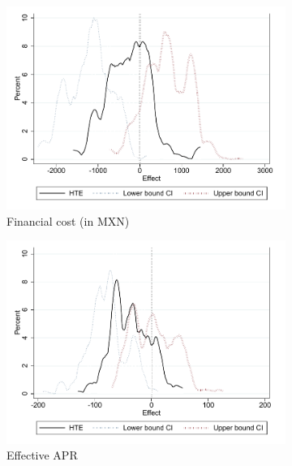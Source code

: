 \documentclass[oneside,11pt]{article}
\begin{document}
\begin{figure}[H]
     \caption{Heterogeneous Treatment Effects}
    \label{heterogeneous_effects}
    \begin{center}
    \begin{subfigure}{.45\textwidth}
      \caption{Financial cost (in MXN)}
        \centering
        \includegraphics[width=\textwidth]{Figuras/he_dist_fc_admin_pro_2.pdf}
    \end{subfigure}
     \begin{subfigure}{0.45\textwidth}
    \caption{Effective APR}
       \centering
      \includegraphics[width=\textwidth]{Figuras/he_dist_apr_pro_2.pdf}
    \end{subfigure}
     \begin{subfigure}{0.45\textwidth}

\end{subfigure}
\end{center}
\end{figure}
\end{document}
